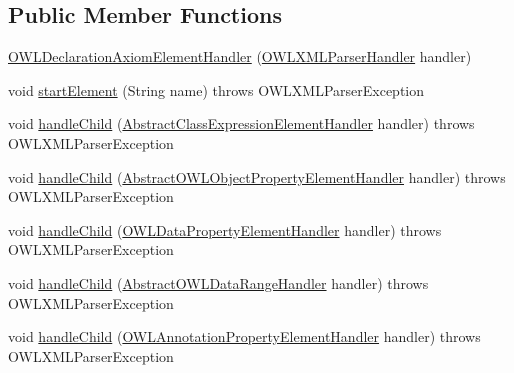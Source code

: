 \subsection*{Public Member Functions}
\begin{DoxyCompactItemize}
\item 
\hyperlink{classorg_1_1coode_1_1owlapi_1_1owlxmlparser_1_1_o_w_l_declaration_axiom_element_handler_afa0d49f67854da2ae848ef311e58d53f}{O\-W\-L\-Declaration\-Axiom\-Element\-Handler} (\hyperlink{classorg_1_1coode_1_1owlapi_1_1owlxmlparser_1_1_o_w_l_x_m_l_parser_handler}{O\-W\-L\-X\-M\-L\-Parser\-Handler} handler)
\item 
void \hyperlink{classorg_1_1coode_1_1owlapi_1_1owlxmlparser_1_1_o_w_l_declaration_axiom_element_handler_a7a0dae2c492eccd2ddd3ef7fa692d550}{start\-Element} (String name)  throws O\-W\-L\-X\-M\-L\-Parser\-Exception 
\item 
void \hyperlink{classorg_1_1coode_1_1owlapi_1_1owlxmlparser_1_1_o_w_l_declaration_axiom_element_handler_a5d642357d4b4c698e29973e06069cf23}{handle\-Child} (\hyperlink{classorg_1_1coode_1_1owlapi_1_1owlxmlparser_1_1_abstract_class_expression_element_handler}{Abstract\-Class\-Expression\-Element\-Handler} handler)  throws O\-W\-L\-X\-M\-L\-Parser\-Exception 
\item 
void \hyperlink{classorg_1_1coode_1_1owlapi_1_1owlxmlparser_1_1_o_w_l_declaration_axiom_element_handler_a0af63da4fda9e18513547009778e32b1}{handle\-Child} (\hyperlink{classorg_1_1coode_1_1owlapi_1_1owlxmlparser_1_1_abstract_o_w_l_object_property_element_handler}{Abstract\-O\-W\-L\-Object\-Property\-Element\-Handler} handler)  throws O\-W\-L\-X\-M\-L\-Parser\-Exception 
\item 
void \hyperlink{classorg_1_1coode_1_1owlapi_1_1owlxmlparser_1_1_o_w_l_declaration_axiom_element_handler_a774c1328319a2ae404f0fec53a067476}{handle\-Child} (\hyperlink{classorg_1_1coode_1_1owlapi_1_1owlxmlparser_1_1_o_w_l_data_property_element_handler}{O\-W\-L\-Data\-Property\-Element\-Handler} handler)  throws O\-W\-L\-X\-M\-L\-Parser\-Exception 
\item 
void \hyperlink{classorg_1_1coode_1_1owlapi_1_1owlxmlparser_1_1_o_w_l_declaration_axiom_element_handler_a8fd1beabf99cf1e43ec21aadea4a09f1}{handle\-Child} (\hyperlink{classorg_1_1coode_1_1owlapi_1_1owlxmlparser_1_1_abstract_o_w_l_data_range_handler}{Abstract\-O\-W\-L\-Data\-Range\-Handler} handler)  throws O\-W\-L\-X\-M\-L\-Parser\-Exception 
\item 
void \hyperlink{classorg_1_1coode_1_1owlapi_1_1owlxmlparser_1_1_o_w_l_declaration_axiom_element_handler_a09977dec3c35892f7311875fba742005}{handle\-Child} (\hyperlink{classorg_1_1coode_1_1owlapi_1_1owlxmlparser_1_1_o_w_l_annotation_property_element_handler}{O\-W\-L\-Annotation\-Property\-Element\-Handler} handler)  throws O\-W\-L\-X\-M\-L\-Parser\-Exception 

\end{DoxyCompactItemize}
